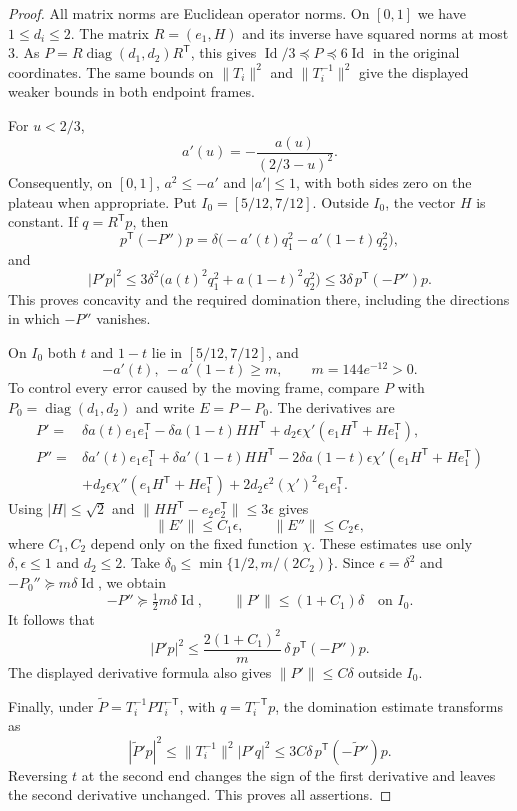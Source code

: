 \begin{proof}
All matrix norms are Euclidean operator norms.
On $[0,1]$ we have $1\le d_i\le2$.  The matrix
$R=(e_1,H)$ and its inverse have squared norms at most $3$.
As $P=R\operatorname{diag}(d_1,d_2)R^{\mathsf T}$, this gives
$\operatorname{Id}/3\preceq P\preceq6\operatorname{Id}$ in the original
coordinates.  The same bounds on $\|T_i\|^2$ and $\|T_i^{-1}\|^2$
give the displayed weaker bounds in both endpoint frames.

For $u<2/3$,
\begin{equation}\label{eq:cutoff-differential}
 a'(u)=-\frac{a(u)}{(2/3-u)^2}.
\end{equation}
Consequently, on $[0,1]$,
$a^2\le-a'$ and $|a'|\le1$, with both sides zero on the plateau when
appropriate.  Put $I_0=[5/12,7/12]$.
Outside $I_0$, the vector $H$ is constant.  If $q=R^{\mathsf T}p$,
then
\[
 p^{\mathsf T}(-P'')p
 =\delta\bigl(-a'(t)q_1^2-a'(1-t)q_2^2\bigr),
\]
and
\[
 |P'p|^2
 \le3\delta^2\bigl(a(t)^2q_1^2+a(1-t)^2q_2^2\bigr)
 \le3\delta\,p^{\mathsf T}(-P'')p.
\]
This proves concavity and the required domination there, including the
directions in which $-P''$ vanishes.

On $I_0$ both $t$ and $1-t$ lie in $[5/12,7/12]$, and
\[
 -a'(t),\ -a'(1-t)\ge m,\qquad m=144e^{-12}>0.
\]
To control every error caused by the moving frame, compare $P$ with
$P_0=\operatorname{diag}(d_1,d_2)$ and write $E=P-P_0$.
The derivatives are
\begin{align*}
 P'={}&\delta a(t)e_1e_1^{\mathsf T}
       -\delta a(1-t)HH^{\mathsf T}
       +d_2\epsilon\chi'(e_1H^{\mathsf T}+He_1^{\mathsf T}),\\
 P''={}&\delta a'(t)e_1e_1^{\mathsf T}
       +\delta a'(1-t)HH^{\mathsf T}
       -2\delta a(1-t)\epsilon\chi'
              (e_1H^{\mathsf T}+He_1^{\mathsf T})\\
       &+d_2\epsilon\chi''(e_1H^{\mathsf T}+He_1^{\mathsf T})
       +2d_2\epsilon^2(\chi')^2e_1e_1^{\mathsf T}.
\end{align*}
Using $|H|\le\sqrt2$ and
$\|HH^{\mathsf T}-e_2e_2^{\mathsf T}\|\le3\epsilon$ gives
\[
 \|E'\|\le C_1\epsilon,
 \qquad \|E''\|\le C_2\epsilon,
\]
where $C_1,C_2$ depend only on the fixed function $\chi$.
These estimates use only $\delta,\epsilon\le1$ and $d_2\le2$.
Take
$\delta_0\le\min\{1/2,m/(2C_2)\}$.
Since $\epsilon=\delta^2$ and $-P_0''\succeq m\delta\operatorname{Id}$,
we obtain
\[
 -P''\succeq\tfrac12m\delta\operatorname{Id},
 \qquad \|P'\|\le(1+C_1)\delta
 \quad\text{on }I_0.
\]
It follows that
\[
 |P'p|^2\le\frac{2(1+C_1)^2}{m}\,
              \delta\,p^{\mathsf T}(-P'')p.
\]
The displayed derivative formula also gives $\|P'\|\le C\delta$
outside $I_0$.

Finally, under $\widetilde P=T_i^{-1}PT_i^{-\mathsf T}$, with
$q=T_i^{-\mathsf T}p$, the domination estimate transforms as
\[
 |\widetilde P'p|^2
 \le\|T_i^{-1}\|^2|P'q|^2
 \le3C\delta\,p^{\mathsf T}(-\widetilde P'')p.
\]
Reversing $t$ at the second end changes the sign of the first derivative
and leaves the second derivative unchanged.  This proves all assertions.
\end{proof}

